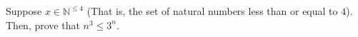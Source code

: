 Suppose $x \in \mathbb{N}^{\leq 4}$ (That is, the set of natural numbers less than or equal to $4$). Then, prove that $n^3 \leq 3^n$.